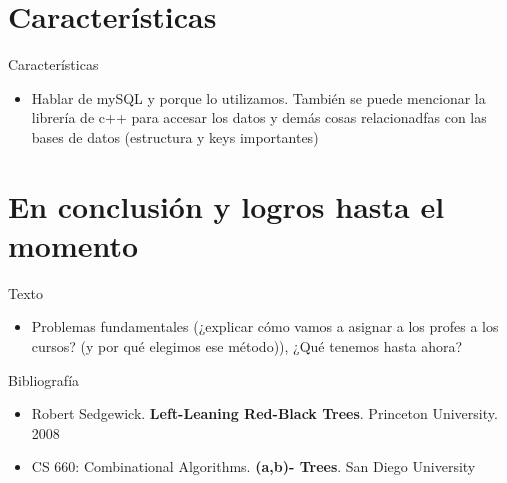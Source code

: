 \documentclass[10pt]{beamer}
\begin{document}
\section{Características}
\begin{frame}{Características}{}
\begin{block}{}

\begin{itemize}

\item Hablar de mySQL y porque lo utilizamos. También se puede mencionar la librería de c++ para accesar los datos y demás cosas relacionadfas con las bases de datos (estructura y keys importantes)

\end{itemize}

 
\end{block}
\end{frame}




\section{En conclusión y logros hasta el momento }
\begin{frame}{Texto}{}
\begin{block}{}

\begin{itemize}
\item Problemas fundamentales (¿explicar cómo vamos a asignar a los profes a los cursos? (y por qué elegimos ese método)), ¿Qué tenemos hasta ahora?
\end{itemize}

  
\end{block}
\end{frame}






\begin{frame}{Bibliografía}{}
\begin{block}{}
\begin{itemize}

\item Robert Sedgewick. \textbf{Left-Leaning Red-Black Trees}. Princeton University. 2008

\item CS 660: Combinational Algorithms. \textbf{(a,b)- Trees}. San Diego University
\end{itemize}
\end{block}
\end{frame}
\end{document}
